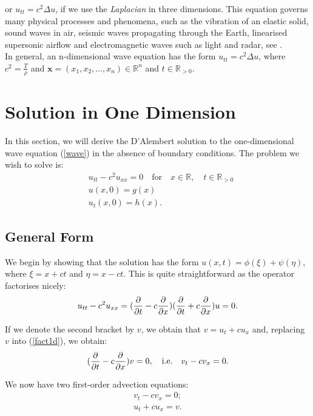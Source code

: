 \documentclass[a4paper, 12pt]{article}
\numberwithin{equation}{section}
\begin{document}
or $u_{tt}=c^2 \Delta u$, if we use the \emph{Laplacian} in three dimensions.
This equation governs many physical processes and phenomena, such as the
vibration of an elastic solid, sound waves in air, seismic waves propagating
through the Earth, linearised supersonic airflow and electromagnetic waves such
as light and radar, see \cite[Ch. 1, Ex. 3]{Str}. \\

In general, an n-dimensional wave equation has the form $u_{tt}=c^2 \Delta u$,
where $c^2=\frac{T}{\rho}$ and $\boldsymbol{x}=(x_1,
x_2, ..., x_n) \in \mathbb{R}^n$ and $t \in \mathbb{R}_{>0}$.

\section{Solution in One Dimension}
In this section, we will derive the D'Alembert solution to the one-dimensional
wave equation (\ref{wave}) in the absence of boundary conditions. The problem we
wish to solve is:
\begin{equation} \label{ivp1d}
    \begin{aligned}
    &u_{tt}-c^2u_{xx}=0 \quad \textrm{for} \quad x\in \mathbb{R},\quad t\in \mathbb{R}_{>0}\\
    &u(x,0)=g(x)\\
    &u_t(x,0)=h(x).
    \end{aligned}
\end{equation}

\subsection{General Form}

We begin by showing that the solution has the form $u(x, t)
=\phi(\xi)+\psi(\eta)$, where $\xi=x+ct$ and $\eta=x-ct$. This is quite
straightforward as the operator factorises nicely:
\begin{equation} \label{fact1d}
    u_{tt}-c^2u_{xx}=(\diffp[1]{}{t} - c \diffp[1]{}{x})(\diffp[1]{}{t} + c \diffp[1]{}{x})u=0.
\end{equation}

If we denote the second bracket by $v$, we obtain that $v=u_t+cu_x$ and, replacing
$v$ into (\ref{fact1d}), we obtain:
\begin{equation*} 
    (\diffp[1]{}{t} -c \diffp[1]{}{x})v=0, \quad \textrm{i.e.} \quad v_t-cv_x=0.
\end{equation*}

We now have two first-order advection equations:
\begin{align}
    v_t-cv_x=0 \label{veq};\\
    u_t+cu_x=v \label{ueq}.
\end{align}
\end{document}

